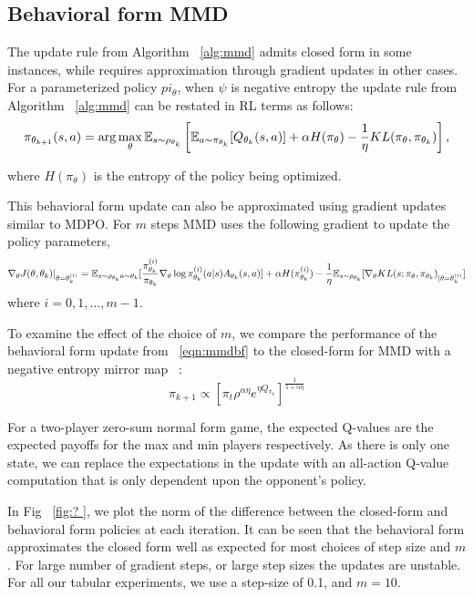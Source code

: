 \subsection{Behavioral form MMD}

The update rule from Algorithm~ \ref{alg:mmd} admits closed form in some instances, while requires
approximation through gradient updates in other cases.
For a parameterized policy $pi_\theta$, when $\psi$ is negative entropy the update rule from
Algorithm~ \ref{alg:mmd} can be restated in RL terms as follows:
\begin{equation}
	\label{eqn:mmdbf}
	\pi_{ \theta_{k+1}}(s,a) = \arg \max_{\theta} \mathbb{E}_{s \sim \rho_{\theta_k}} \left[ \mathbb{E}_{a \sim
			\pi_{\theta_k}} [Q_{\theta_k}(s, a)] + \alpha H(\pi_\theta) - \frac{1}{\eta} KL(\pi_\theta,
		\pi_{\theta_k}) \right],
\end{equation}

where $H(\pi_\theta)$ is the entropy of
the policy being optimized.

This behavioral form update can also be approximated using gradient updates similar to MDPO.
For $m$ steps MMD uses the following gradient to update the policy parameters,
\begin{equation}
	\label{eqn:mmdgrad} \nabla_{\theta} J(\theta, \theta_k)|_{\theta = \theta_k^{(i)}} = \mathbb{E}_{s \sim
		\rho_{\theta_k} \\ a \sim \theta_k} [ \frac{ \pi_{\theta_k}^{(i)}}{ \pi_{\theta_k}} \nabla_{\theta}
		\log \pi_{\theta_k}^{(i)} (a|s) A_{\theta_k}(s,a)] + \alpha H( \pi_{\theta_k}^{(i)}) -
	\frac{1}{\eta} \mathbb{E}_{s \sim \rho_{\theta_k}} [\nabla_\theta KL(s; \pi_\theta,
		\pi_{\theta_k})_{|\theta= \theta_k^{(i)}}]
\end{equation} where $i=0,1,\ldots,m-1$.

To examine the effect of the choice of $m$, we compare the performance of the behavioral form
update from~ \ref{eqn:mmdbf} to the closed-form for MMD with a negative entropy mirror map~
\cite[equation (12)]{sokotaUnified2023}: $$ \pi_{k+1} \propto [\pi_t \rho^{\alpha \eta} e^{\eta
				Q_{\pi_k}}]^{ \frac{1}{1+\alpha \eta}}$$

For a two-player zero-sum normal form
game, the expected Q-values are the expected payoffs for the max and min players respectively.
As there is only one state, we can replace the expectations in the update with an all-action
Q-value computation that is only dependent upon the opponent's policy.

In Fig~ \ref{fig:?
}, we plot the norm of the difference between the closed-form and behavioral form policies at each iteration.
It can be seen that the behavioral form approximates the closed form well as expected for most
choices of step size and $m$.
For large number of gradient steps, or large step sizes the updates are unstable.
For all our tabular experiments, we use a step-size of 0.1, and $m=10$.

